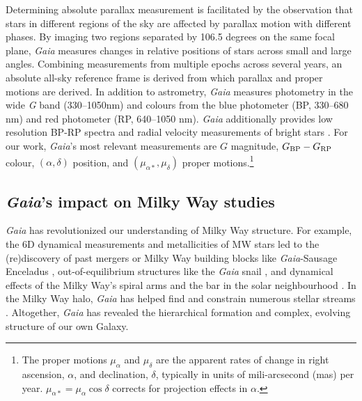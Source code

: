 Determining absolute parallax measurement is facilitated by the
observation that stars in different regions of the sky are affected by
parallax motion with different phases. By imaging two regions separated
by 106.5 degrees on the same focal plane, \emph{Gaia} measures changes
in relative positions of stars across small and large angles. Combining
measurements from multiple epochs across several years, an absolute
all-sky reference frame is derived from which parallax and proper
motions are derived. In addition to astrometry, \emph{Gaia} measures
photometry in the wide \emph{G} band (330--1050nm) and colours from the
blue photometer (BP, 330--680 nm) and red photometer (RP, 640--1050 nm).
\emph{Gaia} additionally provides low resolution BP-RP spectra and
radial velocity measurements of bright stars \citep[of magnitudes
\(G_{\rm RVS} < 16\),][]{gaiacollaboration+2016}. For our work,
\emph{Gaia}'s most relevant measurements are \(G\) magnitude,
\(G_{\rm BP} - G_{\rm RP}\) colour, \((\alpha, \delta)\) position, and
\((\mu_{\alpha*}, \mu_\delta)\) proper motions.\footnote{The proper
  motions \(\mu_\alpha\) and \(\mu_\delta\) are the apparent rates of
  change in right ascension, \(\alpha\), and declination, \(\delta\),
  typically in units of mili-arcsecond (mas) per year.
  \(\mu_{\alpha*} = \mu_\alpha \cos \delta\) corrects for projection
  effects in \(\alpha\).}

\subsection{\texorpdfstring{\emph{Gaia}'s impact on Milky Way
studies}{Gaia's impact on Milky Way studies}}\label{gaias-impact-on-milky-way-studies}

\emph{Gaia} has revolutionized our understanding of Milky Way structure.
For example, the 6D dynamical measurements and metallicities of MW stars
led to the (re)discovery of past mergers or Milky Way building blocks
like \emph{Gaia}-Sausage Enceladus
\citetext{\citealp[e.g.,][]{helmi+2018}; \citealp{belokurov+2018}; \citealp[but
see also][]{meza+2005}}, out-of-equilibrium structures like the
\emph{Gaia} snail \citep[e.g.,][]{antoja+2018}, and dynamical effects of
the Milky Way's spiral arms and the bar in the solar neighbourhood
\citep[ and references therein]{hunt+vasiliev2025}. In the Milky Way
halo, \emph{Gaia} has helped find and constrain numerous stellar streams
\citep{ibata+malhan+martin2019, bonaca+price-whelan2025}. Altogether,
\emph{Gaia} has revealed the hierarchical formation and complex,
evolving structure of our own Galaxy.

